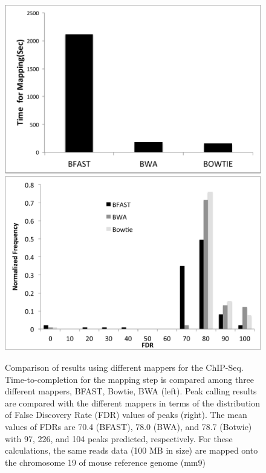 \documentclass{cpeauth}
\begin{document}
\begin{figure}
 \centering
\includegraphics[scale=0.46]{figures/chip-seq-mapper-dependency-ttc.pdf}
\includegraphics[scale=0.34]{figures/chip-seq-mapper-dependency-results.pdf}


\caption{\small Comparison of results using different mappers for the ChIP-Seq.  Time-to-completion for the mapping step is compared among three different mappers, BFAST, Bowtie, BWA (left).  Peak calling results are compared with the different mappers in terms of the distribution of False Discovery Rate (FDR) values of peaks (right).  The mean values of FDRs are 70.4 (BFAST), 78.0 (BWA), and 78.7 (Botwie) with 97, 226, and 104 peaks predicted, respectively.  For these calculations, the same reads data (100 MB in size) are mapped onto the chromosome 19 of mouse reference genome (mm9)}
  \label{fig:chip-seq-comp} 
 \end{figure}
\end{document}
